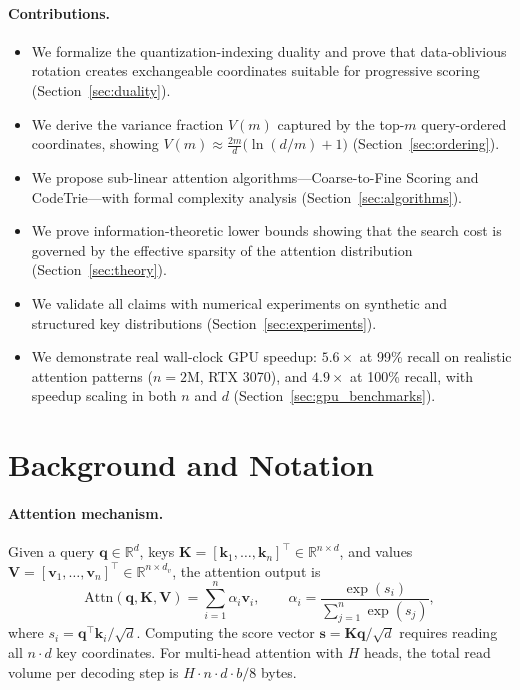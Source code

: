 \documentclass[10pt,twocolumn]{article}
\theoremstyle{definition}
\newcommand{\R}{\mathbb{R}}
\newcommand{\bq}{\mathbf{q}}
\newcommand{\bk}{\mathbf{k}}
\newcommand{\bv}{\mathbf{v}}
\newcommand{\bK}{\mathbf{K}}
\newcommand{\bV}{\mathbf{V}}
\begin{document}
\paragraph{Contributions.}
\begin{itemize}[nosep]
  \item We formalize the quantization-indexing duality and prove that data-oblivious
        rotation creates exchangeable coordinates suitable for progressive scoring
        (Section~\ref{sec:duality}).
  \item We derive the variance fraction $V(m)$ captured by the top-$m$
        query-ordered coordinates, showing $V(m) \approx
        \frac{2m}{d}\bigl(\ln(d/m) + 1\bigr)$ (Section~\ref{sec:ordering}).
  \item We propose sub-linear attention algorithms---Coarse-to-Fine Scoring and
        CodeTrie---with formal complexity analysis
        (Section~\ref{sec:algorithms}).
  \item We prove information-theoretic lower bounds showing that the search cost
        is governed by the effective sparsity of the attention distribution
        (Section~\ref{sec:theory}).
  \item We validate all claims with numerical experiments on synthetic and
        structured key distributions (Section~\ref{sec:experiments}).
  \item We demonstrate real wall-clock GPU speedup: $5.6\times$ at 99\% recall on
        realistic attention patterns ($n = 2$M, RTX 3070), and $4.9\times$ at 100\%
        recall, with speedup scaling in both $n$ and $d$
        (Section~\ref{sec:gpu_benchmarks}).
\end{itemize}


\section{Background and Notation}
\label{sec:background}

\paragraph{Attention mechanism.}
Given a query $\bq \in \R^d$, keys $\bK = [\bk_1, \ldots, \bk_n]^\top \in
\R^{n \times d}$, and values $\bV = [\bv_1, \ldots, \bv_n]^\top \in \R^{n
\times d_v}$, the attention output is
\begin{equation}
  \label{eq:attention}
  \mathrm{Attn}(\bq, \bK, \bV)
    = \sum_{i=1}^{n} \alpha_i \bv_i, \qquad
  \alpha_i
    = \frac{\exp(s_i)}{\sum_{j=1}^n \exp(s_j)},
\end{equation}
where $s_i = \bq^\top \bk_i / \sqrt{d}$.  Computing the score vector
$\mathbf{s} = \bK \bq / \sqrt{d}$ requires reading all $n \cdot d$ key
coordinates.  For multi-head attention with $H$ heads, the total read volume
per decoding step is $H \cdot n \cdot d \cdot b / 8$ bytes.
\end{document}
